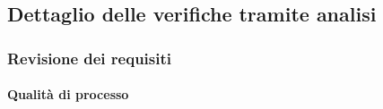 \subsection{Dettaglio delle verifiche tramite analisi}

	\subsubsection{Revisione dei requisiti}
		\paragraph{Qualità di processo}


